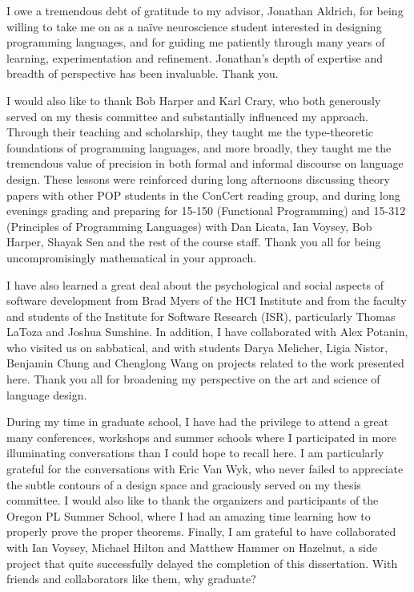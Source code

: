 \documentclass[12pt]{cmuthesis}
\begin{document}
\begin{acknowledgments}
I owe a tremendous debt of gratitude to my advisor, Jonathan Aldrich, for being willing to take me on as a na\"ive neuroscience student interested in designing programming languages, and for guiding me patiently through many years of learning, experimentation and refinement. 
Jonathan's depth of expertise and breadth of perspective has been invaluable. Thank you.%

I would also like to thank Bob Harper and Karl Crary, who both generously served on my thesis committee and substantially influenced my approach. Through their teaching and scholarship, they taught me the type-theoretic foundations of programming languages, and more broadly, they taught me the tremendous value of precision in both formal and informal discourse on language design. These lessons were reinforced during long afternoons discussing theory papers with other POP students in the ConCert reading group,  and during long evenings grading and preparing for 15-150 (Functional Programming) and 15-312 (Principles of Programming Languages) with Dan Licata, Ian Voysey, Bob Harper, Shayak Sen and the rest of the course staff. Thank you all for being uncompromisingly mathematical in your approach.

I have also learned a great deal about the psychological and social aspects of software development from Brad Myers of the HCI Institute and from the faculty and students of the Institute for Software Research (ISR), particularly Thomas LaToza and Joshua Sunshine. In addition, I have collaborated with Alex Potanin, who visited us on sabbatical, and with students Darya Melicher, Ligia Nistor, Benjamin Chung and Chenglong Wang on projects related to the work presented here. Thank you all for broadening my perspective on the art and science of language design. 

During my time in graduate school, I have had the privilege to attend a great many  conferences, workshops and summer schools where I participated in more illuminating conversations than I could  hope to recall here. I am particularly grateful for the conversations with Eric Van Wyk, who never failed to appreciate the subtle contours of a design space and graciously served on my thesis committee. I would also like to thank the organizers and participants of the Oregon PL Summer School, where I had an amazing time learning how to properly prove the proper theorems. Finally, I am grateful to have collaborated with Ian Voysey, Michael Hilton and Matthew Hammer on Hazelnut, a side project that quite successfully delayed the completion of this dissertation. With friends and collaborators like them, why graduate?


\end{acknowledgments}
\end{document}
